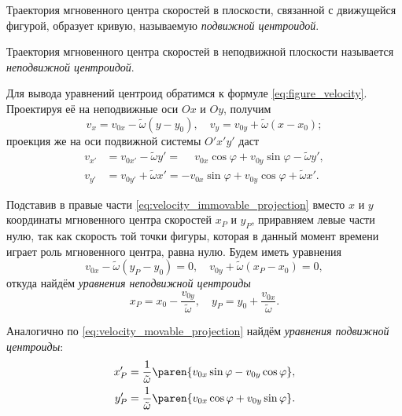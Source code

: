 \begin{definition}
  Траектория мгновенного центра скоростей в плоскости, связанной с движущейся
  фигурой, образует кривую, называемую \textit{подвижной центроидой}.
\end{definition}

\begin{definition}
  Траектория мгновенного центра скоростей в неподвижной плоскости называется
  \textit{неподвижной центроидой}.
\end{definition}

Для вывода уравнений центроид обратимся к формуле \ref{eq:figure_velocity}.
Проектируя её на неподвижные оси $Ox$ и $Oy$, получим
\begin{equation}
  \label{eq:velocity_immovable_projection}
  v_x = v_{0x} - \tilde{\omega} (y - y_0), \quad
  v_y = v_{0y} + \tilde{\omega} (x - x_0);
\end{equation}
проекция же на оси подвижной системы $O'x'y'$ даст
\begin{equation}
  \label{eq:velocity_movable_projection}
  \begin{aligned}
    v_{x'} &= v_{0x'} - \tilde{\omega} y' = \phantom{-}v_{0x} \cos\varphi +
      v_{0y} \sin\varphi - \tilde{\omega} y', \\
    v_{y'} &= v_{0y'} + \tilde{\omega} x' = -v_{0x} \sin\varphi + v_{0y}
      \cos\varphi + \tilde{\omega} x'.
  \end{aligned}
\end{equation}

Подставив в правые части \ref{eq:velocity_immovable_projection} вместо $x$ и
$y$ координаты мгновенного центра скоростей $x_P$ и $y_P$, приравняем левые
части нулю, так как скорость той точки фигуры, которая в данный момент времени
играет роль мгновенного центра, равна нулю. Будем иметь уравнения
\begin{equation*}
  v_{0x} - \tilde{\omega} (y_P - y_0) = 0, \quad
  v_{0y} + \tilde{\omega} (x_P - x_0) = 0,
\end{equation*}
откуда найдём \textit{уравнения неподвижной центроиды}
\begin{equation}
  \label{eq:immovable_centroid}
  x_P = x_0 - \frac{v_{0y}}{\tilde{\omega}}, \quad
  y_P = y_0 + \frac{v_{0x}}{\tilde{\omega}}.
\end{equation}

Аналогично по \ref{eq:velocity_movable_projection} найдём \textit{уравнения
подвижной центроиды}:
\begin{equation}
  \label{eq:movable_centroid}
  \begin{aligned}
    x_P' &= \frac{1}{\tilde{\omega}} \paren{v_{0x} \sin\varphi - v_{0y}
      \cos\varphi}, \\
    y_P' &= \frac{1}{\tilde{\omega}} \paren{v_{0x} \cos\varphi + v_{0y}
      \sin\varphi}.
  \end{aligned}
\end{equation}

